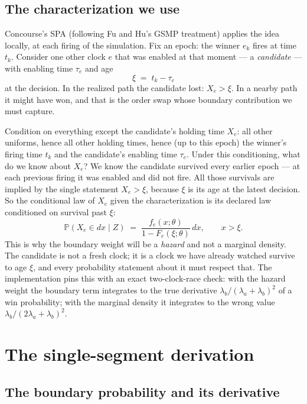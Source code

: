 \documentclass[11pt]{article}
\newcommand{\Prob}{\mathbb{P}}
\begin{document}
\subsection{The characterization we use}

Concourse's SPA (following Fu and Hu's GSMP treatment) applies the idea
locally, at each firing of the simulation. Fix an epoch: the winner $e_k$
fires at time $t_k$. Consider one other clock $e$ that was enabled at
that moment --- a \emph{candidate} --- with enabling time $\tau_e$ and
age
\[
\xi \;=\; t_k - \tau_e
\]
at the decision. In the realized path the candidate lost: $X_e > \xi$.
In a nearby path it might have won, and that is the order swap whose
boundary contribution we must capture.

Condition on everything except the candidate's holding time $X_e$: all
other uniforms, hence all other holding times, hence (up to this epoch)
the winner's firing time $t_k$ and the candidate's enabling time
$\tau_e$. Under this conditioning, what do we know about $X_e$? We know
the candidate survived every earlier epoch --- at each previous firing it
was enabled and did not fire. All those survivals are implied by the
single statement $X_e > \xi$, because $\xi$ is its age at the latest
decision. So the conditional law of $X_e$ given the characterization is
its declared law conditioned on survival past $\xi$:
\[
\Prob(X_e \in dx \mid Z) \;=\; \frac{f_e(x;\theta)}{1 - F_e(\xi;\theta)}\,dx,
\qquad x > \xi .
\]
This is why the boundary weight will be a \emph{hazard} and not a
marginal density. The candidate is not a fresh clock; it is a clock we
have already watched survive to age $\xi$, and every probability
statement about it must respect that. The implementation pins this with
an exact two-clock-race check: with the hazard weight the boundary term
integrates to the true derivative $\lambda_b/(\lambda_a+\lambda_b)^2$ of
a win probability; with the marginal density it integrates to the wrong
value $\lambda_b/(2\lambda_a+\lambda_b)^2$.

\section{The single-segment derivation}

\subsection{The boundary probability and its derivative}
\end{document}
